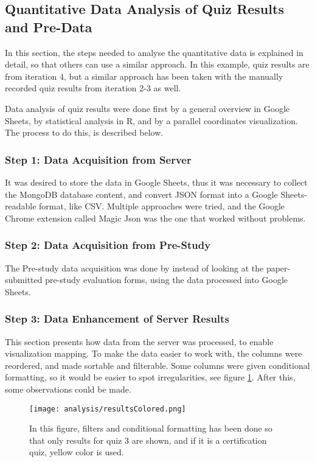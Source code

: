 \subsection{Quantitative Data Analysis of Quiz Results and Pre-Data}

In this section, the steps needed to analyse the quantitative data is explained in detail, so that others can use a similar approach. In this example, quiz results are from iteration 4, but a similar approach has been taken with the manually recorded quiz results from iteration 2-3 as well.

Data analysis of quiz results were done first by a general overview in Google Sheets, by statistical analysis in R, and by a parallel coordinates visualization. The process to do this, is described below.

\subsubsection{Step 1: Data Acquisition from Server}

It was desired to store the data in Google Sheets, thus it was necessary to collect the MongoDB database content, and convert JSON format into a Google Sheets-readable format, like CSV. Multiple approaches were tried, and the Google Chrome extension called Magic Json \citep{agaze} was the one that worked without problems.

\subsubsection{Step 2: Data Acquisition from Pre-Study}

The Pre-study data acquisition was done by instead of looking at the paper-submitted pre-study evaluation forms, using the data processed into Google Sheets.

\subsubsection{Step 3: Data Enhancement of Server Results}

This section presents how data from the server was processed, to enable visualization mapping. To make the data easier to work with, the columns were reordered, and made sortable and filterable. Some columns were given conditional formatting, so it would be easier to spot irregularities, see figure \ref{fig:resultsColored}. After this, some observations could be made.

\begin{figure}[h]
    \centering
    \texttt{[image: analysis/resultsColored.png]}
    \caption{In this figure, filters and conditional formatting has been done so that only results for quiz 3 are shown, and if it is a certification quiz, yellow color is used.}
    \label{fig:resultsColored}
\end{figure}

